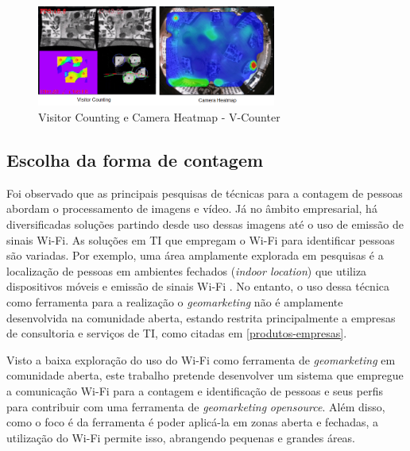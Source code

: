\begin{figure}[htb]
  \caption{\label{v-count2}Visitor Counting e Camera Heatmap - V-Counter}
  \begin{center}
    \includegraphics[width=0.70\textwidth]{img/termal-vcount.png}
  \end{center}
\end{figure}

\subsection{Escolha da forma de contagem}
Foi observado que as principais pesquisas de técnicas para a contagem de pessoas abordam o processamento de imagens e vídeo. Já no âmbito empresarial,
há diversificadas soluções partindo desde uso dessas imagens até o uso de emissão de sinais Wi-Fi.
As soluções em TI que empregam o Wi-Fi para identificar pessoas são variadas. Por exemplo,
uma área amplamente explorada em pesquisas é a localização de pessoas em
ambientes fechados (\emph{indoor location}) que utiliza dispositivos móveis e emissão de sinais Wi-Fi \cite{Ferreira2016}
\cite{Puhl2016} \cite{Figuera2011}. No entanto, o uso dessa técnica como ferramenta para a realização o \emph{geomarketing} não
é amplamente desenvolvida na comunidade aberta, estando restrita principalmente a empresas de consultoria e serviços de TI, como citadas
em \autoref{produtos-empresas}.

Visto a baixa exploração do uso do Wi-Fi como ferramenta de \emph{geomarketing} em comunidade aberta, este trabalho pretende
desenvolver um sistema que empregue a comunicação Wi-Fi para a contagem e identificação de pessoas e seus perfis para contribuir com uma
ferramenta de \emph{geomarketing} \emph{opensource}. Além disso, como o foco é da ferramenta é poder aplicá-la em zonas aberta e fechadas, a utilização
do Wi-Fi permite isso, abrangendo pequenas e grandes áreas.

